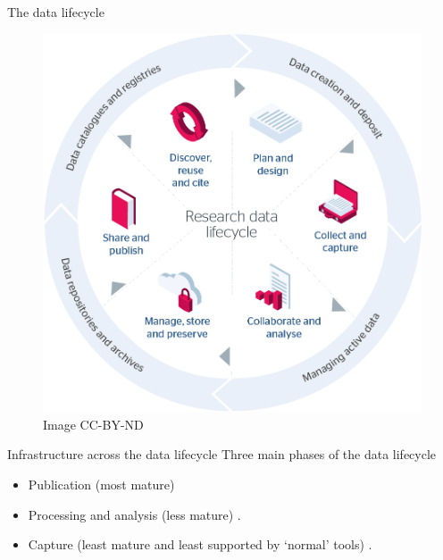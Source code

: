 \documentclass[
	aspectratio=169, %
	12pt, %
	t, %
]{beamer}
\begin{document}
\begin{refsegment}


\begin{frame}{The data lifecycle}
 \begin{figure}[H]
    \centering
    \vspace{-0.5cm}
        \includegraphics[height=.75\textheight]{figures/research-data-life-diagram.png}
        \caption{\cite{Jisc2018-gx} Image CC-BY-ND}
        \label{fig:figure9}
 \end{figure}
\end{frame}



\begin{frame}{Infrastructure across the data lifecycle}
    Three main phases of the data lifecycle
    \begin{itemize}
        \item Publication (most mature)
        \item Processing and analysis (less mature) \parencite{Stewart_Lowndes2017-lj, Alveo2019-tk} .
        \item Capture (least mature and least supported by `normal' tools) \parencite{Bureau_of_Reclamation2017-xl}.
    \end{itemize}
\end{frame}


\end{refsegment}
\end{document}
